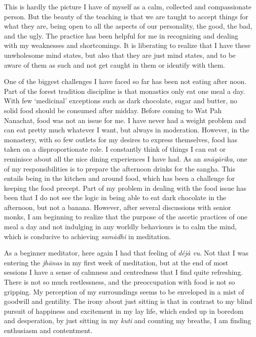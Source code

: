 This is hardly the picture I have of myself as a calm, collected and
compassionate person. But the beauty of the teaching is that we are
taught to accept things for what they are, being open to all the aspects
of our personality, the good, the bad, and the ugly. The practice has
been helpful for me in recognizing and dealing with my weaknesses and
shortcomings. It is liberating to realize that I have these unwholesome
mind states, but also that they are just mind states, and to be aware of
them as such and not get caught in them or identify with them.

One of the biggest challenges I have faced so far has been not eating
after noon. Part of the forest tradition discipline is that monastics
only eat one meal a day. With few `medicinal' exceptions such as dark
chocolate, sugar and butter, no solid food should be consumed after
midday. Before coming to Wat Pah Nanachat, food was not an issue for me.
I have never had a weight problem and can eat pretty much whatever I
want, but always in moderation. However, in the monastery, with so few
outlets for my desires to express themselves, food has taken on a
disproportionate role. I constantly think of things I can eat or
reminisce about all the nice dining experiences I have had. As an
\emph{anāgārika}, one of my responsibilities is to prepare the afternoon
drinks for the sangha. This entails being in the kitchen and around
food, which has been a challenge for keeping the food precept. Part of
my problem in dealing with the food issue has been that I do not see the
logic in being able to eat dark chocolate in the afternoon, but not a
banana. However, after several discussions with senior monks, I am
beginning to realize that the purpose of the ascetic practices of one
meal a day and not indulging in any worldly behaviours is to calm the
mind, which is conducive to achieving \emph{samādhi} in meditation.

As a beginner meditator, here again I had that feeling of \emph{déjà
vu}. Not that I was entering the \emph{jhānas} in my first week of
meditation, but at the end of most sessions I have a sense of calmness
and centredness that I find quite refreshing. There is not so much
restlessness, and the preoccupation with food is not so gripping. My
perception of my surroundings seems to be enveloped in a mist of
goodwill and gentility. The irony about just sitting is that in contrast
to my blind pursuit of happiness and excitement in my lay life, which
ended up in boredom and desperation, by just sitting in my \emph{kuti}
and counting my breaths, I am finding enthusiasm and contentment.

